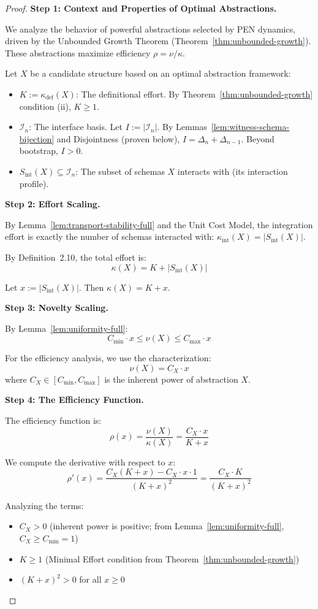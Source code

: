 \documentclass[11pt]{article}
\theoremstyle{definition}
\theoremstyle{remark}
\begin{document}
\begin{proof}
\textbf{Step 1: Context and Properties of Optimal Abstractions.}

We analyze the behavior of powerful abstractions selected by PEN dynamics, driven by the Unbounded
Growth Theorem (Theorem~\ref{thm:unbounded-growth}). These abstractions maximize efficiency
$\rho = \nu/\kappa$.

Let $X$ be a candidate structure based on an optimal abstraction framework:
\begin{itemize}
\item $K := \kappa_{\text{def}}(X)$: The definitional effort. By Theorem~\ref{thm:unbounded-growth}
condition (ii), $K \geq 1$.
\item $\mathcal{I}_n$: The interface basis. Let $I := |\mathcal{I}_n|$. By Lemmas~\ref{lem:witness-schema-bijection}
and Disjointness (proven below), $I = \Delta_n + \Delta_{n-1}$. Beyond bootstrap, $I > 0$.
\item $S_{\text{int}}(X) \subseteq \mathcal{I}_n$: The subset of schemas $X$ interacts with (its interaction profile).
\end{itemize}

\textbf{Step 2: Effort Scaling.}

By Lemma~\ref{lem:transport-stability-full} and the Unit Cost Model, the integration effort is
exactly the number of schemas interacted with: $\kappa_{\text{int}}(X) = |S_{\text{int}}(X)|$.

By Definition~2.10, the total effort is:
\[
\kappa(X) = K + |S_{\text{int}}(X)|
\]

Let $x := |S_{\text{int}}(X)|$. Then $\kappa(X) = K + x$.

\textbf{Step 3: Novelty Scaling.}

By Lemma~\ref{lem:uniformity-full}:
\[
C_{\min} \cdot x \leq \nu(X) \leq C_{\max} \cdot x
\]

For the efficiency analysis, we use the characterization:
\[
\nu(X) = C_X \cdot x
\]
where $C_X \in [C_{\min}, C_{\max}]$ is the inherent power of abstraction $X$.

\textbf{Step 4: The Efficiency Function.}

The efficiency function is:
\[
\rho(x) = \frac{\nu(X)}{\kappa(X)} = \frac{C_X \cdot x}{K + x}
\]

We compute the derivative with respect to $x$:
\[
\rho'(x) = \frac{C_X(K+x) - C_X \cdot x \cdot 1}{(K+x)^2} = \frac{C_X \cdot K}{(K+x)^2}
\]

Analyzing the terms:
\begin{itemize}
\item $C_X > 0$ (inherent power is positive; from Lemma~\ref{lem:uniformity-full}, $C_X \geq C_{\min} = 1$)
\item $K \geq 1$ (Minimal Effort condition from Theorem~\ref{thm:unbounded-growth})
\item $(K+x)^2 > 0$ for all $x \geq 0$
\end{itemize}


\end{proof}
\end{document}
